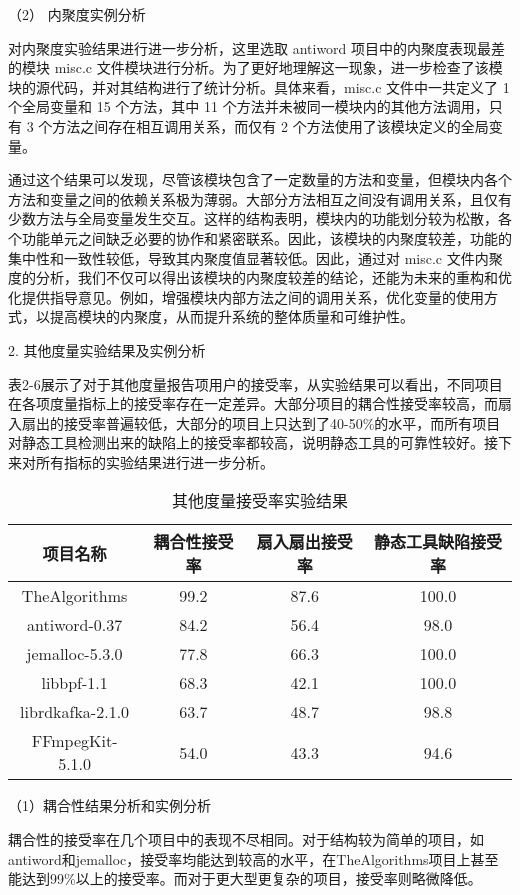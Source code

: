 （2） 内聚度实例分析

对内聚度实验结果进行进一步分析，这里选取 antiword 项目中的内聚度表现最差的模块 misc.c 文件模块进行分析。为了更好地理解这一现象，进一步检查了该模块的源代码，并对其结构进行了统计分析。具体来看，misc.c 文件中一共定义了 1 个全局变量和 15 个方法，其中 11 个方法并未被同一模块内的其他方法调用，只有 3 个方法之间存在相互调用关系，而仅有 2 个方法使用了该模块定义的全局变量。

通过这个结果可以发现，尽管该模块包含了一定数量的方法和变量，但模块内各个方法和变量之间的依赖关系极为薄弱。大部分方法相互之间没有调用关系，且仅有少数方法与全局变量发生交互。这样的结构表明，模块内的功能划分较为松散，各个功能单元之间缺乏必要的协作和紧密联系。因此，该模块的内聚度较差，功能的集中性和一致性较低，导致其内聚度值显著较低。因此，通过对 misc.c 文件内聚度的分析，我们不仅可以得出该模块的内聚度较差的结论，还能为未来的重构和优化提供指导意见。例如，增强模块内部方法之间的调用关系，优化变量的使用方式，以提高模块的内聚度，从而提升系统的整体质量和可维护性。

2. 其他度量实验结果及实例分析

表2-6展示了对于其他度量报告项用户的接受率，从实验结果可以看出，不同项目在各项度量指标上的接受率存在一定差异。大部分项目的耦合性接受率较高，而扇入扇出的接受率普遍较低，大部分的项目上只达到了40-50\%的水平，而所有项目对静态工具检测出来的缺陷上的接受率都较高，说明静态工具的可靠性较好。接下来对所有指标的实验结果进行进一步分析。

\begin{table}[htbp]
\caption{其他度量接受率实验结果}
\vspace{0.5em}\centering\wuhao
\begin{tabular}{cccc}
\toprule
项目名称 & 耦合性接受率 & 扇入扇出接受率 & 静态工具缺陷接受率 \\
\midrule
TheAlgorithms & 99.2 & 87.6 & 100.0 \\
antiword-0.37 & 84.2 & 56.4 & 98.0 \\
jemalloc-5.3.0 & 77.8 & 66.3 & 100.0 \\
libbpf-1.1 & 68.3 & 42.1 & 100.0 \\
librdkafka-2.1.0 & 63.7 & 48.7 & 98.8 \\
FFmpegKit-5.1.0 & 54.0 & 43.3 & 94.6 \\
\bottomrule
\end{tabular}
\end{table}

（1）耦合性结果分析和实例分析

耦合性的接受率在几个项目中的表现不尽相同。对于结构较为简单的项目，如antiword和jemalloc，接受率均能达到较高的水平，在TheAlgorithms项目上甚至能达到99\%以上的接受率。而对于更大型更复杂的项目，接受率则略微降低。

